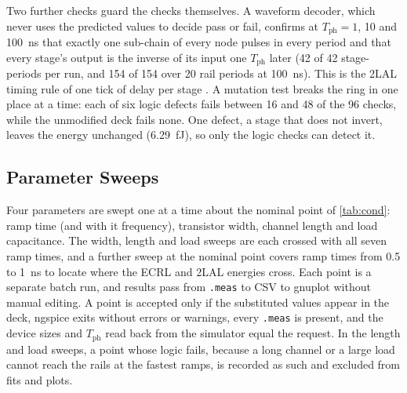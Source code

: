 \documentclass[conference]{IEEEtran}
\newcommand{\Tph}{T_{\mathrm{ph}}}
\begin{document}
Two further checks guard the checks themselves. A waveform decoder, which
never uses the predicted values to decide pass or fail, confirms at
$\Tph=1$, 10 and 100~ns that exactly one sub-chain of every node pulses in
every period and that every stage's output is the inverse of its input one
$\Tph$ later (42 of 42 stage-periods per run, and 154 of 154 over 20 rail
periods at 100~ns). This is the 2LAL timing rule of one tick of delay per
stage \cite{frank2017tutorial}. A mutation test breaks the ring in one place
at a time: each of six logic defects fails between 16 and 48 of the 96
checks, while the unmodified deck fails none. One defect, a stage that does
not invert, leaves the energy unchanged (6.29~fJ), so only the logic checks
can detect it.

\subsection{Parameter Sweeps}
Four parameters are swept one at a time about the nominal point of
\cref{tab:cond}: ramp time (and with it frequency), transistor width, channel
length and load capacitance. The width, length and
load sweeps are each crossed with all seven ramp times, and a further sweep
at the nominal point covers ramp times from 0.5 to 1~ns to locate where the
ECRL and 2LAL energies cross. Each point is a
separate batch run, and results pass from \texttt{.meas} to CSV to gnuplot
without manual editing. A point is accepted only if the substituted values
appear in the deck, ngspice exits without errors or warnings, every
\texttt{.meas} is present, and the device sizes and $\Tph$ read back from
the simulator equal the request. In the length and load sweeps, a point whose
logic fails, because a long channel or a large load cannot reach the rails
at the fastest ramps, is recorded as such and excluded from fits and plots.
\end{document}
